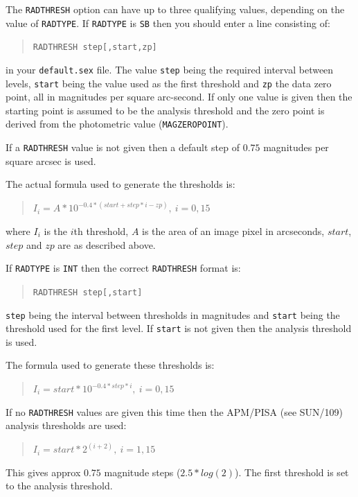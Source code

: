 \documentclass[twoside,11pt]{article}
\newcommand{\xref}[3]{#1}
\renewcommand{\_}{\texttt{\symbol{95}}}
\begin{document}
The \texttt{RAD\_THRESH} option can have up to three qualifying
values, depending on the value of \texttt{RAD\_TYPE}. If
\texttt{RAD\_TYPE} is \texttt{SB} then you should enter a line
consisting of:
\begin{quote}
   \texttt{RAD\_THRESH\hspace{0.5in} step[,start,zp]}
\end{quote}
in your \texttt{default.sex} file. The value \texttt{step} being the
required interval between levels, \texttt{start} being the value used
as the first threshold and \texttt{zp} the data zero point, all in
magnitudes per square arc-second. If only one value is given then the
starting point is assumed to be the analysis threshold and the zero
point is derived from the photometric value (\texttt{MAG\_ZEROPOINT}).

If a \texttt{RAD\_THRESH} value is not given then a default step of
$0.75$ magnitudes per square arcsec is used.

The actual formula used to generate the thresholds is:
\begin{quote}
    $I_{i} = A * 10^{-0.4 * (start+step*i-zp)},\ i = 0, 15$
\end{quote}
where $I_{i}$ is the $i$th threshold, $A$ is the area of an image pixel
in arcseconds, $start$, $step$ and $zp$ are as described above.

If \texttt{RAD\_TYPE} is \texttt{INT} then the correct
\texttt{RAD\_THRESH} format is:
\begin{quote}
   \texttt{RAD\_THRESH \hspace{0.5in} step[,start]}
\end{quote}
\texttt{step} being the interval between thresholds in magnitudes
and \texttt{start} being the threshold used for the first level. If
\texttt{start} is not given then the analysis threshold is used.

The formula used to generate these thresholds is:
\begin{quote}
    $I_{i} = start * 10^{-0.4*step*i},\ i = 0, 15$
\end{quote}

If no \texttt{RAD\_THRESH} values are given this time then the
APM/PISA (see \xref{SUN/109}{sun109}{}) analysis thresholds are used:
\begin{quote}
    $I_{i} = start * 2^{(i+2)},\ i = 1, 15$
\end{quote}
This gives approx $0.75$ magnitude steps ($2.5*log(2)$). The first
threshold is set to the analysis threshold.
\end{document}
